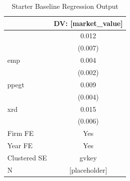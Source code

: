 \begin{table}[!htbp]
\centering
\caption{Starter Baseline Regression Output}
\label{tab:starter_main}
\begin{tabular}{l c}
\toprule
 & DV: [market\_value] \\
\midrule
[hh\_it\_investment\_proxy] & 0.012 \\
 & (0.007) \\
emp & 0.004 \\
 & (0.002) \\
ppegt & 0.009 \\
 & (0.004) \\
xrd & 0.015 \\
 & (0.006) \\
\midrule
Firm FE & Yes \\
Year FE & Yes \\
Clustered SE & gvkey \\
N & [placeholder] \\
\bottomrule
\end{tabular}
\end{table}
